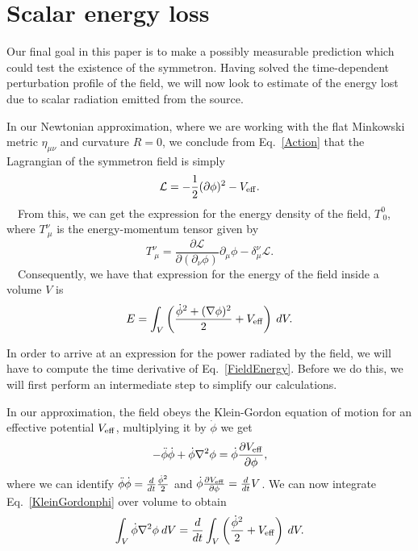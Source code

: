 \documentclass[nofootinbib,twocolumn]{revtex4}
\begin{document}
\section{\label{sec5}Scalar energy loss}

Our final goal in this paper is to make a possibly measurable prediction which could test the existence of the symmetron. Having solved the time-dependent perturbation profile of the field, we will now look to estimate of the energy lost due to scalar radiation emitted from the source.

In our Newtonian approximation, where we are working with the flat Minkowski metric $\eta_{\mu\nu}$ and curvature $R=0$, we conclude from Eq.~\eqref{Action} that the Lagrangian of the symmetron field is simply
\begin{equation}
    \mathcal{L} = -\frac{1}{2} (\partial\phi)^2 - V_{\rm eff}.
\end{equation}
~~From this, we can get the expression for the energy density of the field, $T_{\:0}^0$, where $T_{\:\mu}^{\nu}$ is the energy-momentum tensor given by
\begin{equation}
   T_{\:\mu}^{\nu} = \frac{\partial\mathcal{L}}{\partial(\partial_{\nu}\phi)}\partial_{\mu}\phi-\delta_{\mu}^{\nu}\mathcal{L}.
\end{equation}
~~Consequently, we have that expression for the energy of the field inside a volume $V$ is
\begin{equation}
   E = \int_V  \left(\frac{\Dot{\phi}^2+(\nabla\phi)^2}{2}+V_{\rm eff}\right) \: dV.
   \label{FieldEnergy}
\end{equation}

In order to arrive at an expression for the power radiated by the field, we will have to compute the time derivative of Eq.~\eqref{FieldEnergy}. Before we do this, we will first perform an intermediate step to simplify our calculations.

In our approximation, the field obeys the Klein-Gordon equation of motion for an effective potential $V_{\rm eff}$, multiplying it by $\Dot{\phi}$ we get
\begin{equation}
    -\Ddot{\phi}\Dot{\phi} +\Dot{\phi}\nabla^2\phi = \Dot{\phi}\frac{\partial V_{\rm eff}}{\partial\phi},
    \label{KleinGordonphi}
\end{equation}
where we can identify $\Ddot{\phi}\Dot{\phi} = \frac{d}{dt}\frac{\Dot{\phi}^2}{2}$ and $\Dot{\phi}\frac{\partial V_{\rm eff}}{\partial\phi} = \frac{d}{dt}V$. 
We can now integrate Eq.~\eqref{KleinGordonphi} over volume to obtain
\begin{equation}
    \int_V \Dot{\phi}\nabla^2\phi \: dV = \frac{d}{dt}\int_V \left(\frac{\Dot{\phi}^2}{2} + V_{\rm eff}\right)\:dV.
    \label{midStep}
\end{equation}
\end{document}
